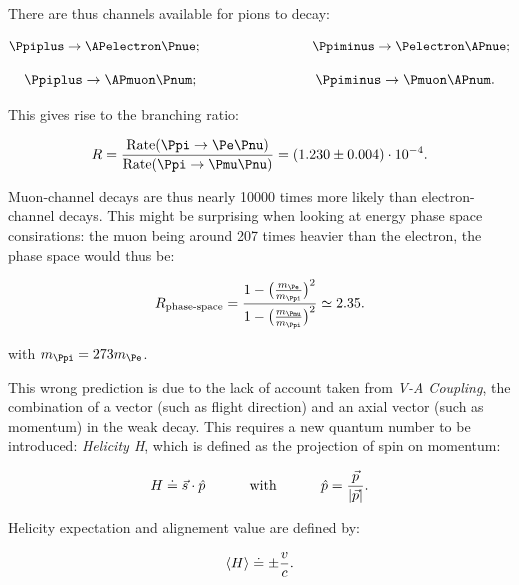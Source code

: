 There are thus channels available for pions to decay:

\begin{equation*}
\Ppiplus \rightarrow \APelectron \Pnue \text{;\hspace{3cm}}\Ppiminus \rightarrow \Pelectron \APnue;
\end{equation*}

\begin{equation*}
\Ppiplus \rightarrow \APmuon \Pnum \text{;\hspace{3cm}}\Ppiminus \rightarrow \Pmuon \APnum.
\end{equation*}

This gives rise to the branching ratio:

\begin{equation}
R=\frac{\text{Rate}(\Ppi\rightarrow \Pe \Pnu)}{\text{Rate}(\Ppi\rightarrow \Pmu \Pnu)} = (1.230 \pm 0.004) \cdot 10^{-4}.
\end{equation}

Muon-channel decays are thus nearly 10000 times more likely than electron-channel decays. This might be surprising when looking at energy phase space consirations: the muon being around 207 times heavier than the electron, the phase space would thus be:

\begin{equation}
R_{\text{phase-space}}=\frac{1-\big(\frac{m_{\Pe}}{m_{\Ppi}}\big)^2}{1-\big(\frac{m_{\Pmu}}{m_{\Ppi}}\big)^2} \simeq 2.35.
\end{equation}

with $m_{\Ppi} = 273 m_{\Pe}$.

This wrong prediction is due to the lack of account taken from \textit{V-A Coupling}, the combination of a vector (such as flight direction) and an axial vector (such as momentum) in the weak decay. This requires a new quantum number to be introduced: \textit{Helicity H}, which is defined as the projection of spin on momentum:

\begin{equation*}
H\doteq \vec{s}\cdot \hat{p} \text{\hspace {1cm} with \hspace{1cm}} \hat{p}=\frac{\vec{p}}{|\vec{p}|}.
\end{equation*}

Helicity  expectation and alignement value are defined by:

\begin{equation*}
\Braket{H}\doteq\pm\frac{v}{c}.
\end{equation*}

